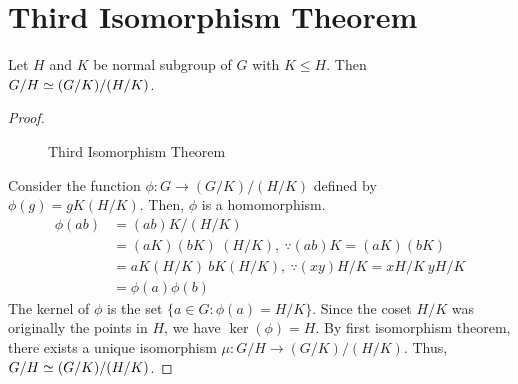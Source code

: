 \section{Third Isomorphism Theorem}
\begin{theorem}
	Let $H$ and $K$ be normal subgroup of $G$ with $K \le H$.
	Then $G/H \simeq (G/K)/(H/K)$.
\end{theorem}
\begin{proof}
\begin{figure}[h]
	\centering
	\caption{Third Isomorphism Theorem}
\end{figure}
	Consider the function $\phi : G \to (G/K)/(H/K)$ defined by $\phi(g) = gK(H/K)$.
	Then, $\phi$ is a homomorphism.
	\begin{align*}
		\phi(ab) & = (ab)K/(H/K) \\
		& = (aK)(bK)\ (H/K),\ \because (ab)K = (aK)(bK) \\
		& = aK(H/K)\ bK(H/K),\ \because (xy)H/K = xH/K\ yH/K\\
		& = \phi(a) \phi(b)
	\end{align*}
	The kernel of $\phi$ is the set $\{ a \in G : \phi(a) = H/K \}$.
	Since the coset $H/K$ was originally the points in $H$, we have $\ker(\phi) = H$.
	By first isomorphism theorem, there exists a unique isomorphism $\mu : G/H \to (G/K)/(H/K)$. Thus, $G/H \simeq (G/K)/(H/K)$.
\end{proof}

